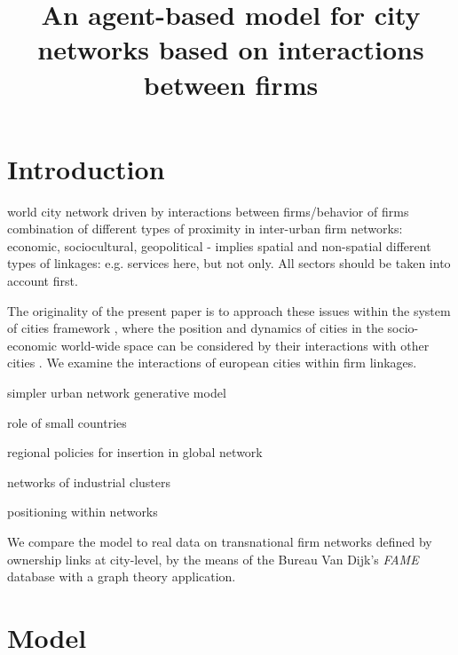 \documentclass{article}
\title{An agent-based model for city networks based on interactions between firms}
\date{}
\begin{document}
\maketitle


\section{Introduction}

\citep{taylor2001specification} world city network driven by interactions between firms/behavior of firms
\citep{martinus2018global} combination of different types of proximity in inter-urban firm networks: economic, sociocultural, geopolitical - implies spatial and non-spatial 
\citep{pan2017mapping} different types of linkages: e.g. services here, but not only. All sectors should be taken into account first.

The originality of the present paper is to approach these issues within the system of cities framework \citep{berry1964cities}, where the position and dynamics of cities in the socio-economic world-wide space can be considered by their interactions with other cities \citep{pumain1997pour}. We examine the interactions of european cities within firm linkages. 

\cite{dai2016generative} simpler urban network generative model

\cite{martinus2019brokerage} role of small countries

\cite{dawley2019creating} regional policies for insertion in global network

\cite{turkina2016structure} networks of industrial clusters

\cite{gluckler2016relational} positioning within networks


We compare the model to real data on transnational firm networks defined by ownership links at city-level, by the means of the Bureau Van Dijk's \emph {FAME} database with a graph theory application. 

\section{Model}
\end{document}
